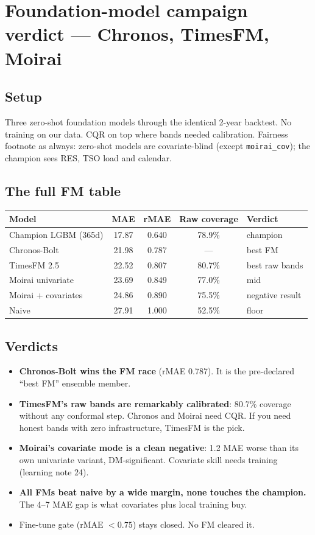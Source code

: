 \section{Foundation-model campaign verdict --- Chronos, TimesFM, Moirai}

\subsection{Setup}

Three zero-shot foundation models through the identical 2-year
backtest. No training on our data. CQR on top where bands needed
calibration. Fairness footnote as always: zero-shot models are
covariate-blind (except \texttt{moirai\_cov}); the champion sees
RES, TSO load and calendar.

\subsection{The full FM table}

\begin{tabular}{lcccl}
\hline
Model & MAE & rMAE & Raw coverage & Verdict \\
\hline
Champion LGBM (365d) & 17.87 & 0.640 & 78.9\% & champion \\
Chronos-Bolt & 21.98 & 0.787 & --- & best FM \\
TimesFM 2.5 & 22.52 & 0.807 & 80.7\% & best raw bands \\
Moirai univariate & 23.69 & 0.849 & 77.0\% & mid \\
Moirai + covariates & 24.86 & 0.890 & 75.5\% & negative result \\
Naive & 27.91 & 1.000 & 52.5\% & floor \\
\hline
\end{tabular}

\subsection{Verdicts}

\begin{itemize}
\item \textbf{Chronos-Bolt wins the FM race} (rMAE 0.787). It is the
      pre-declared ``best FM'' ensemble member.
\item \textbf{TimesFM's raw bands are remarkably calibrated}: 80.7\%
      coverage without any conformal step. Chronos and Moirai need
      CQR. If you need honest bands with zero infrastructure,
      TimesFM is the pick.
\item \textbf{Moirai's covariate mode is a clean negative}: 1.2 MAE
      worse than its own univariate variant, DM-significant.
      Covariate skill needs training (learning note 24).
\item \textbf{All FMs beat naive by a wide margin, none touches the
      champion.} The 4--7 MAE gap is what covariates plus local
      training buy.
\item Fine-tune gate (rMAE $< 0.75$) stays closed. No FM cleared it.
\end{itemize}

